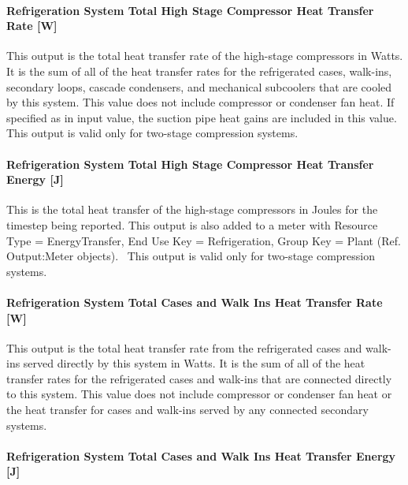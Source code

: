 \paragraph{Refrigeration System Total High Stage Compressor Heat Transfer Rate {[}W{]}}\label{refrigeration-system-total-high-stage-compressor-heat-transfer-rate-w}

This output is the total heat transfer rate of the high-stage compressors in Watts. It is the sum of all of the heat transfer rates for the refrigerated cases, walk-ins, secondary loops, cascade condensers, and mechanical subcoolers that are cooled by this system. This value does not include compressor or condenser fan heat. If specified as in input value, the suction pipe heat gains are included in this value.~ This output is valid only for two-stage compression systems.

\paragraph{Refrigeration System Total High Stage Compressor Heat Transfer Energy {[}J{]}}\label{refrigeration-system-total-high-stage-compressor-heat-transfer-energy-j}

This is the total heat transfer of the high-stage compressors in Joules for the timestep being reported. This output is also added to a meter with Resource Type = EnergyTransfer, End Use Key = Refrigeration, Group Key = Plant (Ref. Output:Meter objects).~ This output is valid only for two-stage compression systems.

\paragraph{Refrigeration System Total Cases and Walk Ins Heat Transfer Rate {[}W{]}}\label{refrigeration-system-total-cases-and-walk-ins-heat-transfer-rate-w}

This output is the total heat transfer rate from the refrigerated cases and walk-ins served directly by this system in Watts. It is the sum of all of the heat transfer rates for the refrigerated cases and walk-ins that are connected directly to this system. This value does not include compressor or condenser fan heat or the heat transfer for cases and walk-ins served by any connected secondary systems.

\paragraph{Refrigeration System Total Cases and Walk Ins Heat Transfer Energy {[}J{]}}\label{refrigeration-system-total-cases-and-walk-ins-heat-transfer-energy-j}

